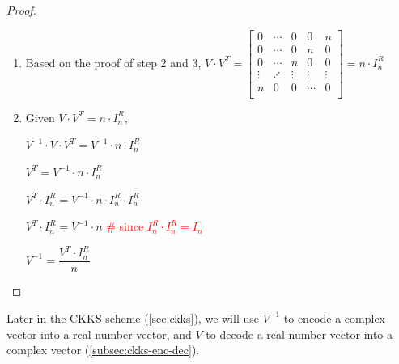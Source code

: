 \begin{proof}
\begin{enumerate}
$ $

Therefore,

$\sum\limits_{k=0}^{n-1} \omega^{2k} = \sum\limits_{k=0}^{n-1} \omega^{4k} = \sum\limits_{k=0}^{n-1} \omega^{6k} = \cdots = \sum\limits_{k=0}^{n-1} \omega^{2(n-1)k} = \sum\limits_{k=0}^{n-1} \omega^{2(n+1)k} = \cdots = \sum\limits_{k=0}^{n-1} \omega^{2(2n-1)k} = 0$

$ $

\item Based on the proof of step 2 and 3, $V \cdot V^T = 
\begin{bmatrix}
0 & \cdots & 0 & 0 & n\\
0 & \cdots & 0 & n & 0\\
0 & \cdots & n & 0 & 0\\
\vdots & \iddots & \vdots & \vdots & \vdots \\
n & 0 & 0 & \cdots & 0\\
\end{bmatrix} = n \cdot I_n^R$

\item Given $V \cdot V^T = n \cdot I_n^R$, 

$V^{-1} \cdot V \cdot V^T = V^{-1} \cdot n \cdot I_n^R$

$V^T = V^{-1} \cdot n \cdot I_n^R$

$V^T \cdot I_n^R = V^{-1} \cdot n \cdot I_n^R  \cdot I_n^R$

$V^T \cdot I_n^R = V^{-1} \cdot n$ \textcolor{red}{\text{ } \# since $I_n^R  \cdot I_n^R = I_n$}

$V^{-1} = \dfrac{V^T \cdot I_n^R}{n}$

\end{enumerate}
\end{proof}

Later in the CKKS scheme (\autoref{sec:ckks}), we will use $V^{-1}$ to encode a complex vector into a real number vector, and $V$ to decode a real number vector into a complex vector (\autoref{subsec:ckks-enc-dec}).

$ $




